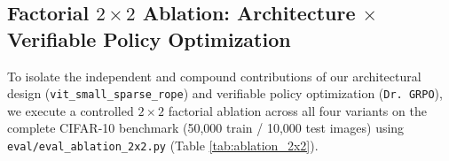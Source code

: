 \documentclass[11pt,a4paper]{article}
\begin{document}
\subsection{Factorial \texorpdfstring{$2\times 2$}{2x2} Ablation: Architecture \texorpdfstring{$\times$}{x} Verifiable Policy Optimization}
\label{subsec:grpo_ablation}

To isolate the independent and compound contributions of our architectural design (\texttt{vit\_small\_}\allowbreak\texttt{sparse\_rope}) and verifiable policy optimization (\texttt{Dr.\ GRPO}), we execute a controlled $2\times 2$ factorial ablation across all four variants on the complete CIFAR-10 benchmark (50,000 train / 10,000 test images) using \texttt{eval/eval\_ablation\_2x2.py} (Table \ref{tab:ablation_2x2}).
\end{document}
